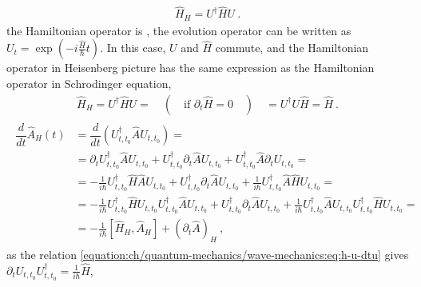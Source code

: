\documentclass[letterpaper,10pt,english]{jupyterBook}
\begin{document}
\sphinxAtStartPar
{}
\begin{equation*}
\begin{split}\hat{H}_H = U^\dagger \hat{H} U  \ .\end{split}
\end{equation*}
\sphinxAtStartPar
{} the Hamiltonian operator is , the evolution operator can be written as \(U_{t} = \exp\left(-i \frac{\hat{H}}{\hbar} t  \right)\). In this case, \(U\) and \(\hat{H}\) commute, and the Hamiltonian operator in Heisenberg picture has the same expression as the Hamiltonian operator in Schrodinger equation,
\begin{equation*}
\begin{split}\hat{H}_H = U^{\dagger} \hat{H} U = \quad ( \quad \text{if $\partial_t \hat{H} = 0$} \quad ) \quad = U^{\dagger} U \hat{H} = \hat{H} \ .\end{split}
\end{equation*}
\sphinxAtStartPar
{}
\begin{equation}\label{equation:ch/quantum-mechanics/intro:eq:qm:heisenberg:dAdt}
\begin{split}\begin{aligned}
  \dfrac{d}{dt} \hat{A}_H(t)
  & = \dfrac{d}{dt} \left( U^{\dagger}_{t,t_0} \hat{A} U_{t,t_0} \right) = \\
  & = \partial_t U^{\dagger}_{t,t_0} \hat{A} U_{t,t_0} + U^{\dagger}_{t,t_0} \partial_t \hat{A} U_{t,t_0} + U^{\dagger}_{t,t_0} \hat{A} \partial_t U_{t,t_0} = \\
  & = - \frac{1}{i \hbar} U^{\dagger}_{t,t_0} \hat{H} \hat{A} U_{t,t_0} + U^{\dagger}_{t,t_0} \partial_t \hat{A} U_{t,t_0} +\frac{1}{i \hbar}  U^{\dagger}_{t,t_0} \hat{A} \hat{H} U_{t,t_0} = \\
  & = - \frac{1}{i \hbar} U^{\dagger}_{t,t_0} \hat{H} U_{t,t_0} U^{\dagger}_{t,t_0} \hat{A} U_{t,t_0} + U^{\dagger}_{t,t_0} \partial_t \hat{A} U_{t,t_0} +\frac{1}{i \hbar}  U^{\dagger}_{t,t_0} \hat{A} U_{t,t_0} U^{\dagger}_{t,t_0}  \hat{H} U_{t,t_0} = \\
  & = - \frac{1}{i\hbar} \left[ \hat{H}_H, \hat{A}_H \right] + \left( \partial_t \hat{A} \right)_H  \ ,
\end{aligned}\end{split}
\end{equation}
\sphinxAtStartPar
as the relation \eqref{equation:ch/quantum-mechanics/wave-mechanics:eq:h-u-dtu} gives \(\partial_t U_{t,t_0} U^{\dagger}_{t,t_0} = \frac{1}{i \hbar} \hat{H}\),
\end{document}
